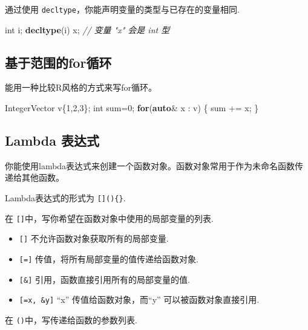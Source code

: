 \documentclass[]{ctexbook}
\newenvironment{Shaded}{\begin{snugshade}}{\end{snugshade}}
\newcommand{\KeywordTok}[1]{\textcolor[rgb]{0.13,0.29,0.53}{\textbf{#1}}}
\newcommand{\DataTypeTok}[1]{\textcolor[rgb]{0.13,0.29,0.53}{#1}}
\newcommand{\DecValTok}[1]{\textcolor[rgb]{0.00,0.00,0.81}{#1}}
\newcommand{\CommentTok}[1]{\textcolor[rgb]{0.56,0.35,0.01}{\textit{#1}}}
\newcommand{\ControlFlowTok}[1]{\textcolor[rgb]{0.13,0.29,0.53}{\textbf{#1}}}
\newcommand{\NormalTok}[1]{#1}
\providecommand{\tightlist}{%
  \setlength{\itemsep}{0pt}\setlength{\parskip}{0pt}}
\begin{document}
通过使用 \texttt{decltype}，你能声明变量的类型与已存在的变量相同.

\begin{Shaded}
\begin{Highlighting}[]
\DataTypeTok{int}\NormalTok{ i;}
\KeywordTok{decltype}\NormalTok{(i) x; }\CommentTok{// 变量 "x" 会是 int 型}
\end{Highlighting}
\end{Shaded}

\subsection{基于范围的for循环}\label{rangefor}

能用一种比较R风格的方式来写for循环。

\begin{Shaded}
\begin{Highlighting}[]
\NormalTok{IntegerVector v\{}\DecValTok{1}\NormalTok{,}\DecValTok{2}\NormalTok{,}\DecValTok{3}\NormalTok{\};}
\DataTypeTok{int}\NormalTok{ sum=}\DecValTok{0}\NormalTok{;}
\ControlFlowTok{for}\NormalTok{(}\KeywordTok{auto}\NormalTok{& x : v) \{}
\NormalTok{  sum += x;}
\NormalTok{\}}
\end{Highlighting}
\end{Shaded}

\subsection{Lambda 表达式}\label{Lambda}

你能使用lambda表达式来创建一个函数对象。函数对象常用于作为未命名函数传递给其他函数。

Lambda表达式的形式为 \texttt{{[}{]}()\{\}}.

在 \texttt{{[}{]}}中，写你希望在函数对象中使用的局部变量的列表.

\begin{itemize}
\tightlist
\item
  \texttt{{[}{]}} 不允许函数对象获取所有的局部变量.
\item
  \texttt{{[}={]}} 传值，将所有局部变量的值传递给函数对象.
\item
  \texttt{{[}\&{]}} 引用，函数直接引用所有的局部变量的值.
\item
  \texttt{{[}=x,\ \&y{]}} ``x'' 传值给函数对象，而``y''
  可以被函数对象直接引用.
\end{itemize}

在 \texttt{()}中，写传递给函数的参数列表.
\end{document}
